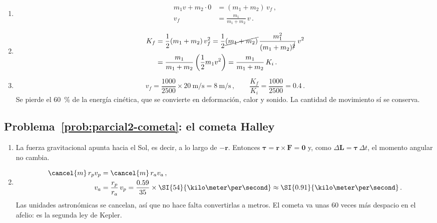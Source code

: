 \begin{enumerate}[label=\alph*)]
    \item
    \begin{align}
        m_1 v + m_2 \cdot 0 &= (m_1 + m_2)\,v_f\,, \nonumber\\
        v_f &= \frac{m_1}{m_1 + m_2}\,v\,.
    \end{align}
    \item
    \begin{align}
        K_f &= \frac{1}{2}(m_1 + m_2)\,v_f^2
             = \frac{1}{2}\cancel{(m_1 + m_2)}\,\frac{m_1^2}{(m_1 + m_2)^{\cancel{2}}}\,v^2 \nonumber\\
            &= \frac{m_1}{m_1 + m_2}\left(\frac{1}{2}m_1 v^2\right)
             = \frac{m_1}{m_1 + m_2}\,K_i\,.
    \end{align}
    \item
    \begin{equation}
        v_f = \frac{1000}{2500} \times \SI{20}{\meter\per\second}
            = \SI{8}{\meter\per\second}\,,
        \qquad
        \frac{K_f}{K_i} = \frac{1000}{2500} = 0.4\,.
    \end{equation}
    Se pierde el \SI{60}{\percent} de la energía cinética, que se convierte en
    deformación, calor y sonido. La cantidad de movimiento sí se conserva.
\end{enumerate}

\subsection*{Problema~\ref{prob:parcial2-cometa}: el cometa Halley}
\label{sol:parcial2-cometa}

\begin{enumerate}[label=\alph*)]
    \item La fuerza gravitacional apunta hacia el Sol, es decir, a lo largo de
    $-\boldsymbol{r}$. Entonces
    $\boldsymbol{\tau} = \boldsymbol{r}\times\boldsymbol{F} = \boldsymbol{0}$
    y, como $\Delta\boldsymbol{L} = \boldsymbol{\tau}\,\Delta t$, el momento
    angular no cambia.
    \item
    \begin{align}
        \cancel{m}\, r_p v_p &= \cancel{m}\, r_a v_a\,, \nonumber\\
        v_a &= \frac{r_p}{r_a}\,v_p
             = \frac{0.59}{35} \times \SI{54}{\kilo\meter\per\second}
             \approx \SI{0.91}{\kilo\meter\per\second}\,.
    \end{align}
    Las unidades astronómicas se cancelan, así que no hace falta convertirlas
    a metros. El cometa va unas 60 veces más despacio en el afelio: es la
    segunda ley de Kepler.
\end{enumerate}

